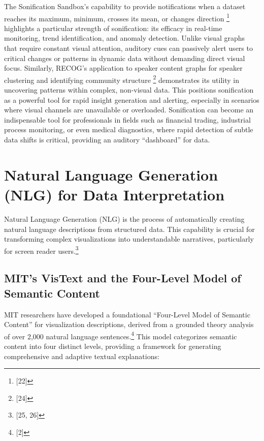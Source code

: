 The Sonification Sandbox's capability to provide notifications when a dataset reaches its maximum, minimum, crosses its mean, or changes direction \footnote{[22]} highlights a particular strength of sonification: its efficacy in real-time monitoring, trend identification, and anomaly detection. Unlike visual graphs that require constant visual attention, auditory cues can passively alert users to critical changes or patterns in dynamic data without demanding direct visual focus. Similarly, RECOG's application to speaker content graphs for speaker clustering and identifying community structure \footnote{[24]} demonstrates its utility in uncovering patterns within complex, non-visual data. This positions sonification as a powerful tool for rapid insight generation and alerting, especially in scenarios where visual channels are unavailable or overloaded. Sonification can become an indispensable tool for professionals in fields such as financial trading, industrial process monitoring, or even medical diagnostics, where rapid detection of subtle data shifts is critical, providing an auditory ``dashboard'' for data.

\section{Natural Language Generation (NLG) for Data Interpretation}
Natural Language Generation (NLG) is the process of automatically creating natural language descriptions from structured data. This capability is crucial for transforming complex visualizations into understandable narratives, particularly for screen reader users.\footnote{[25, 26]}

\subsection{MIT's VisText and the Four-Level Model of Semantic Content}
MIT researchers have developed a foundational ``Four-Level Model of Semantic Content'' for visualization descriptions, derived from a grounded theory analysis of over 2,000 natural language sentences.\footnote{[2]} This model categorizes semantic content into four distinct levels, providing a framework for generating comprehensive and adaptive textual explanations:

